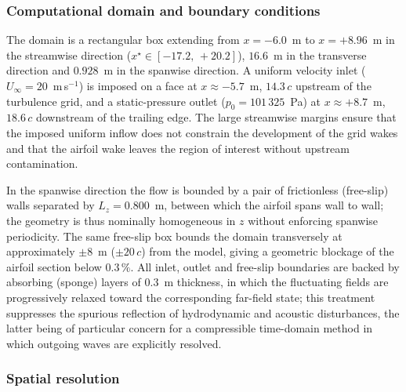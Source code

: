 \documentclass[lineno]{JFM-FLM_Au}
\begin{document}
\subsubsection{Computational domain and boundary conditions}

The domain is a rectangular box extending from $x = -6.0$~m to
$x = +8.96$~m in the streamwise direction
($x^{\star} \in [-17.2,\,+20.2]$), $16.6$~m in the transverse
direction and $0.928$~m in the spanwise direction. A uniform velocity
inlet ($U_{\infty} = 20$~m\,s$^{-1}$) is imposed on a face at
$x \approx -5.7$~m, $14.3\,c$ upstream of the turbulence grid, and a
static-pressure outlet ($p_0 = 101\,325$~Pa) at $x \approx +8.7$~m,
$18.6\,c$ downstream of the trailing edge. The large streamwise
margins ensure that the imposed uniform inflow does not constrain the
development of the grid wakes and that the airfoil wake leaves the
region of interest without upstream contamination.

In the spanwise direction the flow is bounded by a pair of
frictionless (free-slip) walls separated by $L_z = 0.800$~m, between
which the airfoil spans wall to wall; the geometry is thus nominally
homogeneous in $z$ without enforcing spanwise periodicity. The same
free-slip box bounds the domain transversely at approximately
$\pm 8$~m ($\pm 20\,c$) from the model, giving a geometric blockage
of the airfoil section below $0.3\,\%$. All inlet, outlet and
free-slip boundaries are backed by absorbing (sponge) layers of
$0.3$~m thickness, in which the fluctuating fields are progressively
relaxed toward the corresponding far-field state; this treatment
suppresses the spurious reflection of hydrodynamic and acoustic
disturbances, the latter being of particular concern for a
compressible time-domain method in which outgoing waves are
explicitly resolved.

\subsubsection{Spatial resolution}
\end{document}
